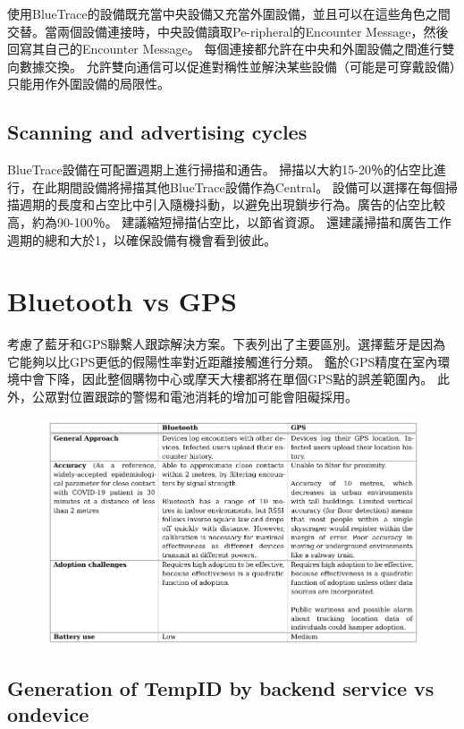 \documentclass[12pt, a4paper]{report}
\begin{document}
使用BlueTrace的設備既充當中央設備又充當外圍設備，並且可以在這些角色之間交替。當兩個設備連接時，中央設備讀取Pe-ripheral的Encounter Message，然後回寫其自己的Encounter Message。 每個連接都允許在中央和外圍設備之間進行雙向數據交換。 允許雙向通信可以促進對稱性並解決某些設備（可能是可穿戴設備）只能用作外圍設備的局限性。

\subsection{Scanning and advertising cycles}

BlueTrace設備在可配置週期上進行掃描和通告。 掃描以大約15-20％的佔空比進行，在此期間設備將掃描其他BlueTrace設備作為Central。 設備可以選擇在每個掃描週期的長度和占空比中引入隨機抖動，以避免出現鎖步行為。廣告的佔空比較高，約為90-100％。 建議縮短掃描佔空比，以節省資源。 還建議掃描和廣告工作週期的總和大於1，以確保設備有機會看到彼此。

\section{Bluetooth vs GPS}

考慮了藍牙和GPS聯繫人跟踪解決方案。下表列出了主要區別。選擇藍牙是因為它能夠以比GPS更低的假陽性率對近距離接觸進行分類。 鑑於GPS精度在室內環境中會下降，因此整個購物中心或摩天大樓都將在單個GPS點的誤差範圍內。 此外，公眾對位置跟踪的警惕和電池消耗的增加可能會阻礙採用。

\begin{figure}[H] %
    \centering %
    \includegraphics[width=1\textwidth]{blueTooth_VS_GPS.png} %
\end{figure}

\subsection{Generation of TempID by backend service vs ondevice}
\end{document}
